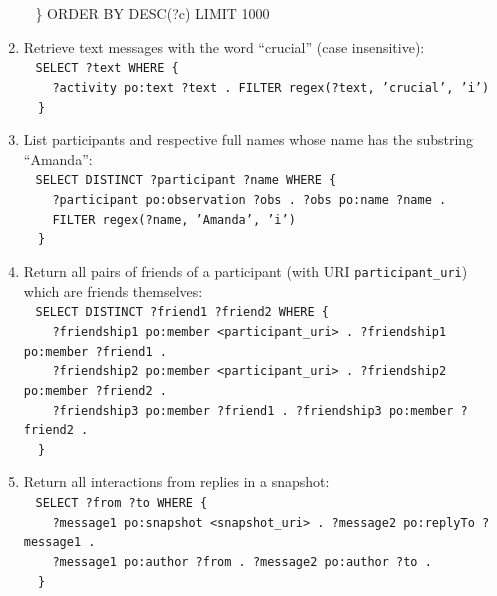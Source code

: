 \documentclass[journal,article,submit,moreauthors,pdftex]{Definitions/mdpi}
\newcommand{\textttt}[1] {\texttt{\footnotesize#1}}
\newcommand{\h} {\hphantom ~ }
\begin{document}
\begin{enumerate}[leftmargin=0cm]
{            \h\} ORDER BY DESC(?c) LIMIT 1000}
        \item Retrieve text messages with the word ``crucial'' (case insensitive):\\
            \h\textttt{SELECT ?text WHERE \{ \\
            \h        \h ?activity po:text ?text . FILTER regex(?text, 'crucial', 'i')\\
            \h\}}
\item List participants and respective full names whose name has the substring ``Amanda'':\\
    \h\textttt{SELECT DISTINCT ?participant ?name WHERE \{\\
    \h\h ?participant po:observation ?obs . ?obs po:name ?name .\\
    \h\h FILTER regex(?name, 'Amanda', 'i') \\
    \h\}}
  \item Return all pairs of friends of a participant (with URI \textttt{participant\_uri}) which are friends themselves:\\
     \h\textttt{SELECT DISTINCT ?friend1 ?friend2 WHERE \{\\
     \h\h       ?friendship1 po:member <participant\_uri> . ?friendship1 po:member ?friend1 .\\
     \h\h       ?friendship2 po:member <participant\_uri> . ?friendship2 po:member ?friend2 .\\
     \h\h       ?friendship3 po:member ?friend1 . ?friendship3 po:member ?friend2 .\\
     \h\}}
\item Return all interactions from replies in a snapshot:\\
    \h\textttt{SELECT ?from ?to WHERE \{\\
    \h      \h  ?message1 po:snapshot <snapshot\_uri> .  ?message2 po:replyTo ?message1 .\\
    \h      \h  ?message1 po:author ?from .  ?message2 po:author ?to .\\
    \h\}}
\end{enumerate}
\end{document}
